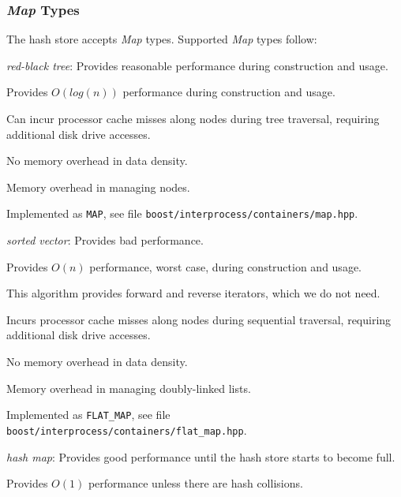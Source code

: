 \documentclass[12pt,twoside]{article}
\begin{document}
\subsubsection{\emph{Map} Types}
The hash store accepts \emph{Map} types.
Supported \emph{Map} types follow:
\begin{compactitem}
\item \emph{red-black tree}:
Provides reasonable performance during construction and usage.
\begin{compactitem}
\item Provides \begin{math}{O(log(n))}\end{math} performance during construction and usage.
\item Can incur processor cache misses along nodes during tree traversal,
requiring additional disk drive accesses.
\item No memory overhead in data density.
\item Memory overhead in managing nodes.
\item Implemented as \texttt{MAP},
see file \texttt{boost/interprocess/containers/map.hpp}.
\end{compactitem}
\item \emph{sorted vector}:
Provides bad performance.
\begin{compactitem}
\item Provides \begin{math}{O(n)}\end{math} performance, worst case, during construction and usage.
\item This algorithm provides forward and reverse iterators, which we do not need.
\item Incurs processor cache misses along nodes during sequential traversal,
requiring additional disk drive accesses.
\item No memory overhead in data density.
\item Memory overhead in managing doubly-linked lists.
\item Implemented as \texttt{FLAT\_MAP},
see file \texttt{boost/interprocess/containers/flat\_map.hpp}.
\end{compactitem}
\item \emph{hash map}:
Provides good performance until the hash store starts to become full.
\begin{compactitem}
\item Provides \begin{math}{O(1)}\end{math} performance unless there are hash collisions.

\end{compactitem}
\end{compactitem}
\end{document}
